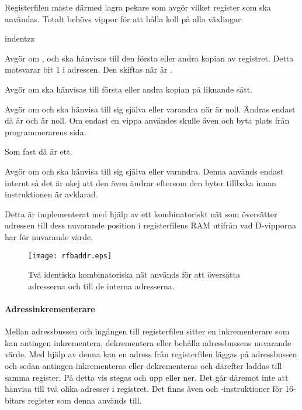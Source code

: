\documentclass[main.tex]{subfiles}
\begin{document}
Registerfilen måste därmed lagra pekare som avgör vilket register som ska
användas. Totalt behövs vippor för att hålla koll på alla växlingar:
\begin{labeling}{indentzz}
\item[\mono{reg}]
    Avgör om ,  och  ska hänvisas till den första
    eller andra kopian av registret. Detta motsvarar bit 1 i adressen. Den
    skiftas när  är
    .
\item[\mono{af}]
    Avgör om  ska hänvisas till första eller andra kopian på liknande
    sätt.
\item[\mono{dehl0}]
    Avgör om  och  ska hänvisa till sig själva eller varandra
    när  är noll. Ändras endast då  är  och
     är noll. Om endast en vippa användes skulle även  och
     byta plats från programmerarens sida.
\item[\mono{dehl1}]
    Som  fast då  är ett.
\item[\mono{afwz}]
    Avgör om  och  ska hänvisa till sig själva eller
    varandra. Denna används endast internt så det är okej att den även ändrar
     eftersom den byter tillbaka innan instruktionen är avklarad.
\end{labeling}

Detta är implementerat med hjälp av ett kombinatoriskt nät som översätter
adressen till dess nuvarande position i registerfilens RAM utifrån vad
D-vipporna har för nuvarande värde.

\begin{figure}
    \center
    \texttt{[image: rfbaddr.eps]}
    \caption{Två identiska kombinatoriska nät används för att översätta
    adresserna  och  till de interna adresserna.}
    \label{fig:rfbaddr}
\end{figure}

\paragraph{Adressinkrementerare} %
Mellan adressbussen och ingången till registerfilen sitter en inkrementerare
som kan antingen inkrementera, dekrementera eller behålla adressbussens nuvarande
värde. Med hjälp av denna kan en adress från registerfilen läggas på
adressbussen och sedan antingen inkrementeras eller dekrementeras och därefter
laddas till samma register. På detta vis stegas  och  upp
eller ner. Det går däremot inte att hänvisa till två olika adresser i
registret. Det finns även  och -instruktioner för 16-bitars
register som denna används till.
\end{document}
